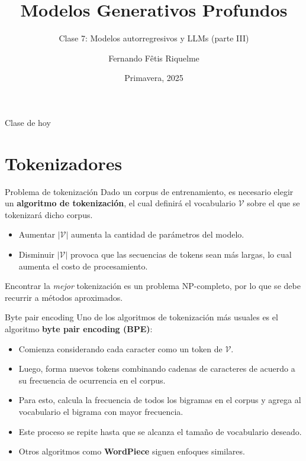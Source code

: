 \documentclass{beamer}
\title{Modelos Generativos Profundos}
\subtitle{Clase 7: Modelos autorregresivos y LLMs (parte III)}
\author{Fernando Fêtis Riquelme}
\institute{
    Facultad de Ciencias Físicas y Matemáticas\\
    Universidad de Chile
}
\date{Primavera, 2025}
\begin{document}
\begin{frame}
    \titlepage
\end{frame}

\begin{frame}{Clase de hoy}
    \tableofcontents
\end{frame}

\section{Tokenizadores}

\begin{frame}{Problema de tokenización}
    Dado un corpus de entrenamiento, es necesario elegir un \textbf{algoritmo de tokenización}, el cual definirá el vocabulario $\mathcal{V}$ sobre el que se tokenizará dicho corpus.
    \begin{itemize}
        \item Aumentar $|\mathcal{V}|$ aumenta la cantidad de parámetros del modelo.
        \item Disminuir $|\mathcal{V}|$ provoca que las secuencias de tokens sean más largas, lo cual aumenta el costo de procesamiento.
    \end{itemize}
    Encontrar la \textit{mejor} tokenización es un problema NP-completo, por lo que se debe recurrir a métodos aproximados.
\end{frame}

\begin{frame}{Byte pair encoding}
    Uno de los algoritmos de tokenización más usuales es el algoritmo \textbf{byte pair encoding (BPE)}:
    \begin{itemize}
        \item Comienza considerando cada caracter como un token de $\mathcal{V}$.
        \item Luego, forma nuevos tokens combinando cadenas de caracteres de acuerdo a su frecuencia de ocurrencia en el corpus.
        \item Para esto, calcula la frecuencia de todos los bigramas en el corpus y agrega al vocabulario el bigrama con mayor frecuencia.
        \item Este proceso se repite hasta que se alcanza el tamaño de vocabulario deseado.
        \item Otros algoritmos como \textbf{WordPiece} siguen enfoques similares.
    \end{itemize}
\end{frame}
\end{document}
